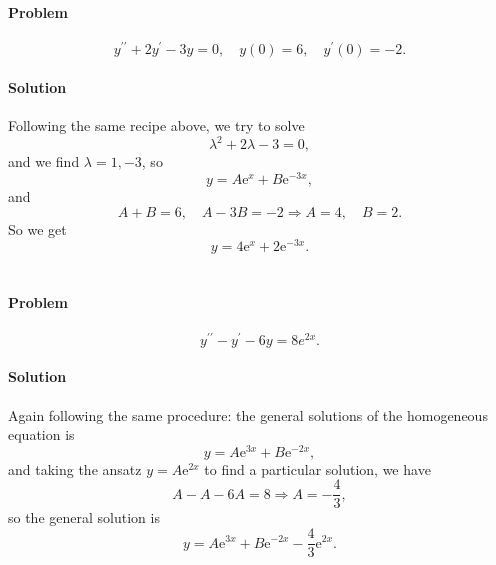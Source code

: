 \documentclass[hyperref, a4paper]{article}
\newcommand*{\ee}{\mathrm{e}}
\begin{document}
\section{}

\paragraph*{Problem} \begin{equation}
    y^{\prime \prime}+2 y^{\prime}-3 y=0 , \quad y(0)=6, \quad y^{\prime}(0)=-2.
\end{equation}

\paragraph*{Solution} Following the same recipe above, we try to solve 
\[
    \lambda^2 + 2 \lambda - 3 = 0,
\]
and we find $\lambda = 1, -3$, so 
\begin{equation}
    y = A \ee^{x} + B \ee^{-3x},
\end{equation}
and 
\[
    A + B = 6, \quad A - 3 B = -2 \Rightarrow
    A = 4, \quad B = 2.
\]
So we get 
\begin{equation}
    y = 4 \ee^{x} + 2 \ee^{-3x}.
\end{equation}

\section{}

\paragraph*{Problem} \begin{equation}
    y^{\prime \prime}-y^{\prime}-6 y=8 e^{2 x}.
\end{equation}

\paragraph*{Solution} Again following the same procedure: 
the general solutions of the homogeneous equation is 
\[
    y = A \ee^{3x} + B \ee^{-2x},
\]
and taking the ansatz $y = A \ee^{2x}$ to find a particular solution, we have 
\[
    A - A - 6 A = 8 \Rightarrow A = - \frac{4}{3},
\]
so the general solution is 
\begin{equation}
    y = A \ee^{3x} + B \ee^{-2x} - \frac{4}{3} \ee^{2x}.
\end{equation}
\end{document}
